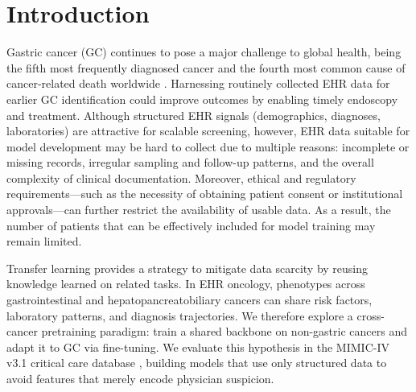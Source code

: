 \documentclass[journal,article,submit,pdftex,moreauthors]{Definitions/mdpi}
\begin{document}
\section{Introduction}
Gastric cancer (GC) continues to pose a major challenge to global health, being the fifth most frequently diagnosed cancer and the fourth most common cause of cancer-related death worldwide \cite{sung2021global}. 
Harnessing routinely collected EHR data for earlier GC identification could improve outcomes by enabling timely endoscopy and treatment.
Although structured EHR signals (demographics, diagnoses, laboratories) are attractive for scalable screening,
however, EHR data suitable for model development may be hard to collect due to multiple reasons: incomplete or missing records, irregular sampling and follow-up patterns, and the overall complexity of clinical documentation.
Moreover, ethical and regulatory requirements—such as the necessity of obtaining patient consent or institutional approvals—can further restrict the availability of usable data.
As a result, the number of patients that can be effectively included for model training may remain limited.

Transfer learning provides a strategy to mitigate data scarcity by reusing knowledge learned on related tasks.
In EHR oncology, phenotypes across gastrointestinal and hepatopancreatobiliary cancers can share risk factors, laboratory patterns, and diagnosis trajectories.
We therefore explore a cross-cancer pretraining paradigm: train a shared backbone on non-gastric cancers and adapt it to GC via fine-tuning.
We evaluate this hypothesis in the MIMIC-IV v3.1 critical care database \citep{Johnson2024MIMICIV}, building models that use only structured data to avoid features that merely encode physician suspicion.


\end{document}
